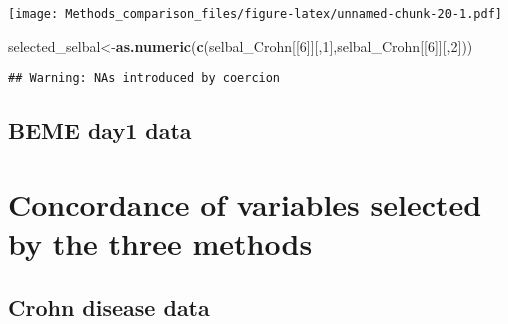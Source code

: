 \documentclass[]{book}
\newenvironment{Shaded}{\begin{snugshade}}{\end{snugshade}}
\newcommand{\KeywordTok}[1]{\textcolor[rgb]{0.13,0.29,0.53}{\textbf{#1}}}
\newcommand{\DecValTok}[1]{\textcolor[rgb]{0.00,0.00,0.81}{#1}}
\newcommand{\StringTok}[1]{\textcolor[rgb]{0.31,0.60,0.02}{#1}}
\newcommand{\OperatorTok}[1]{\textcolor[rgb]{0.81,0.36,0.00}{\textbf{#1}}}
\newcommand{\NormalTok}[1]{#1}
\begin{document}
\texttt{[image: Methods\_comparison\_files/figure-latex/unnamed-chunk-20-1.pdf]}

\begin{Shaded}
\begin{Highlighting}[]
\NormalTok{selected_selbal<-}\KeywordTok{as.numeric}\NormalTok{(}\KeywordTok{c}\NormalTok{(selbal_Crohn[[}\DecValTok{6}\NormalTok{]][,}\DecValTok{1}\NormalTok{],selbal_Crohn[[}\DecValTok{6}\NormalTok{]][,}\DecValTok{2}\NormalTok{]))}
\end{Highlighting}
\end{Shaded}

\begin{verbatim}
## Warning: NAs introduced by coercion
\end{verbatim}

\begin{Shaded}
\end{Shaded}

\section{BEME day1 data}\label{beme-day1-data-3}

\chapter{Concordance of variables selected by the three
methods}\label{comparison}

\section{Crohn disease data}\label{crohn-disease-data-4}
\end{document}
